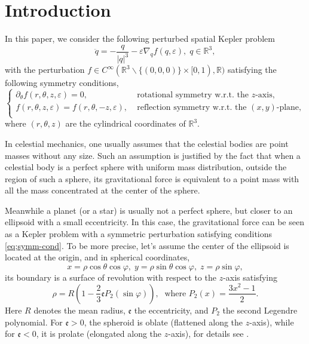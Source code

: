 \documentclass[11pt]{amsart}
\newcommand{\rr}{\mathbb R}
\newcommand{\ep}{\varepsilon}
\newcommand{\tht}{\theta}
\newcommand{\fe}{\mathfrak{e}}
\begin{document}
\section{Introduction}\label{sec:Introduction}

In this paper, we consider the following perturbed spatial Kepler problem
\begin{equation}
	\label{eq;Kepler-perturb} \ddot{q} = -\frac{q}{|q|^3} -\ep \nabla_{q} f(q, \ep), \; q \in \rr^3,
\end{equation}
with the perturbation $f \in C^{\infty}(\rr^3\backslash\{(0,0,0)\} \times [0, 1), \rr)$ satisfying the following symmetry conditions,
\begin{equation}
	\label{eq;symm-cond} \begin{cases}
		\partial_{\tht} f(r, \tht, z, \ep) = 0, \; & \text{rotational symmetry w.r.t. the $z$-axis}, \\
		f(r, \tht, z, \ep) = f(r, \tht, -z, \ep), \; & \text{reflection symmetry w.r.t. the $(x,y)$-plane},\\
	\end{cases}
\end{equation}
where $(r, \tht, z)$ are the cylindrical coordinates of $\rr^3$.


In celestial mechanics, one usually assumes that the celestial bodies are point masses without any size. Such an assumption is justified by the fact that when a celestial body is a perfect sphere with uniform mass distribution, outside the region of such a sphere, its gravitational force is equivalent to a point mass with all the mass concentrated at the center of the sphere. 

Meanwhile a planet (or a star) is usually not a perfect sphere, but closer to an ellipsoid with a small eccentricity. In this case, the gravitational force can be seen as a Kepler problem with a symmetric perturbation satisfying conditions \eqref{eq;symm-cond}. To be more precise, let's assume the center of the ellipsoid is located at the origin, and in spherical coordinates, 
$$  x=\rho\cos\theta\cos\varphi, \; y=\rho\sin\theta\cos\varphi, \; z=\rho\sin\varphi, $$
its boundary is a surface of revolution with respect to the $z$-axis satisfying 
\begin{equation}
	\rho=R\left( 1-\frac{2}{3}\fe P_{2}(\sin\varphi)\right), \; \text{ where } P_{2}(x) = \frac{3x^{2}-1}{2}.
\end{equation}
Here $R$ denotes the mean radius, $\fe$ the eccentricity, and $P_2$ the second Legendre polynomial. For $\fe>0$, the spheroid is oblate (flattened along the $z$-axis), while for $\fe<0$, it is prolate (elongated along the $z$-axis), for details see \cite[page 29-33]{Fit12}.
\end{document}

